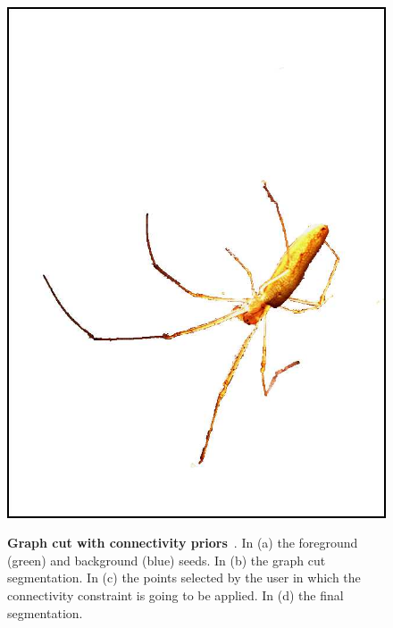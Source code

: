 \begin{figure}
{\includegraphics[scale=0.15]{figures/chapter2/grabcut-connectivity/cp-4.png}
}
\caption{\textbf{Graph cut with connectivity priors}~\cite{vicente08graph}. In (a) the foreground (green) and background (blue) seeds. In (b) the graph cut segmentation. In (c) the points selected by the user in which the connectivity constraint is going to be applied. In (d) the final segmentation. }
\label{ch2:fig:graphcut-connectivity}
\end{figure}



